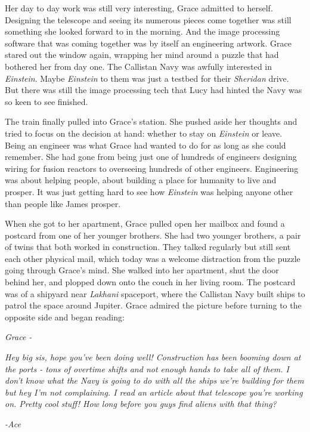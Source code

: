 \documentclass[12pt]{article} %
\begin{document}
Her day to day work was still very interesting, Grace admitted to herself. Designing the telescope and seeing its numerous pieces come together was still something she looked forward to in the morning. And the image processing software that was coming together was by itself an engineering artwork. Grace stared out the window again, wrapping her mind around a puzzle that had bothered her from day one. The Callistan Navy was awfully interested in \textit{Einstein}. Maybe \textit{Einstein} to them was just a testbed for their \textit{Sheridan} drive. But there was still the image processing tech that Lucy had hinted the Navy was so keen to see finished.

The train finally pulled into Grace's station. She pushed aside her thoughts and tried to focus on the decision at hand: whether to stay on \textit{Einstein} or leave. Being an engineer was what Grace had wanted to do for as long as she could remember. She had gone from being just one of hundreds of engineers designing wiring for fusion reactors to overseeing hundreds of other engineers. Engineering was about helping people, about building a place for humanity to live and prosper. It was just getting hard to see how \textit{Einstein} was helping anyone other than people like James prosper.

When she got to her apartment, Grace pulled open her mailbox and found a postcard from one of her younger brothers. She had two younger brothers, a pair of twins that both worked in construction. They talked regularly but still sent each other physical mail, which today was a welcome distraction from the puzzle going through Grace's mind. She walked into her apartment, shut the door behind her, and plopped down onto the couch in her living room. The postcard was of a shipyard near \textit{Lakhani} spaceport, where the Callistan Navy built ships to patrol the space around Jupiter. Grace admired the picture before turning to the opposite side and began reading:

\textit{Grace - }

\textit{Hey big sis, hope you've been doing well! Construction has been booming down at the ports - tons of overtime shifts and not enough hands to take all of them. I don't know what the Navy is going to do with all the ships we're building for them but hey I'm not complaining. I read an article about that telescope you're working on. Pretty cool stuff! How long before you guys find aliens with that thing?}

\textit{-Ace}
\end{document}
